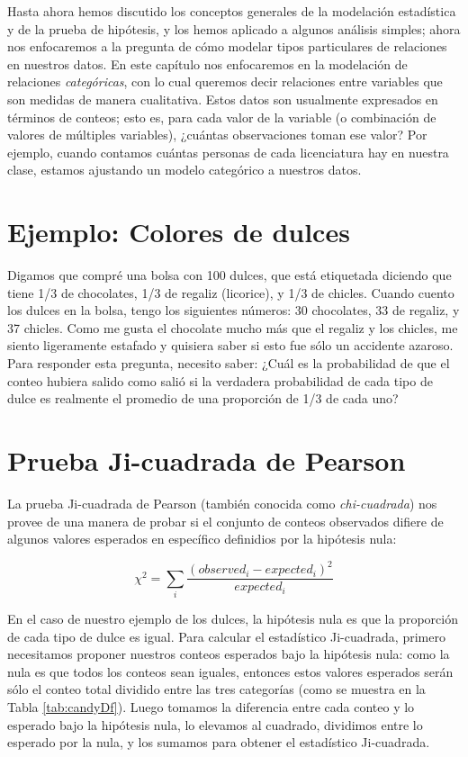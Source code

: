 \documentclass[
  12pt,
]{book}
\begin{document}
Hasta ahora hemos discutido los conceptos generales de la modelación estadística y de la prueba de hipótesis, y los hemos aplicado a algunos análisis simples; ahora nos enfocaremos a la pregunta de cómo modelar tipos particulares de relaciones en nuestros datos. En este capítulo nos enfocaremos en la modelación de relaciones \emph{categóricas}, con lo cual queremos decir relaciones entre variables que son medidas de manera cualitativa. Estos datos son usualmente expresados en términos de conteos; esto es, para cada valor de la variable (o combinación de valores de múltiples variables), ¿cuántas observaciones toman ese valor? Por ejemplo, cuando contamos cuántas personas de cada licenciatura hay en nuestra clase, estamos ajustando un modelo categórico a nuestros datos.

\hypertarget{ejemplo-colores-de-dulces}{%
\section{Ejemplo: Colores de dulces}\label{ejemplo-colores-de-dulces}}

Digamos que compré una bolsa con 100 dulces, que está etiquetada diciendo que tiene 1/3 de chocolates, 1/3 de regaliz (licorice), y 1/3 de chicles. Cuando cuento los dulces en la bolsa, tengo los siguientes números: 30 chocolates, 33 de regaliz, y 37 chicles. Como me gusta el chocolate mucho más que el regaliz y los chicles, me siento ligeramente estafado y quisiera saber si esto fue sólo un accidente azaroso. Para responder esta pregunta, necesito saber: ¿Cuál es la probabilidad de que el conteo hubiera salido como salió si la verdadera probabilidad de cada tipo de dulce es realmente el promedio de una proporción de 1/3 de cada uno?

\hypertarget{chi-squared-test}{%
\section{Prueba Ji-cuadrada de Pearson}\label{chi-squared-test}}

La prueba Ji-cuadrada de Pearson (también conocida como \emph{chi-cuadrada}) nos provee de una manera de probar si el conjunto de conteos observados difiere de algunos valores esperados en específico definidios por la hipótesis nula:

\[
\chi^2 = \sum_i\frac{(observed_i - expected_i)^2}{expected_i}
\]

En el caso de nuestro ejemplo de los dulces, la hipótesis nula es que la proporción de cada tipo de dulce es igual. Para calcular el estadístico Ji-cuadrada, primero necesitamos proponer nuestros conteos esperados bajo la hipótesis nula: como la nula es que todos los conteos sean iguales, entonces estos valores esperados serán sólo el conteo total dividido entre las tres categorías (como se muestra en la Tabla \ref{tab:candyDf}). Luego tomamos la diferencia entre cada conteo y lo esperado bajo la hipótesis nula, lo elevamos al cuadrado, dividimos entre lo esperado por la nula, y los sumamos para obtener el estadístico Ji-cuadrada.
\end{document}
